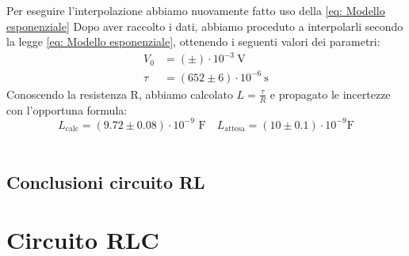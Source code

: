 \documentclass[letterpaper,12pt]{article}
\begin{document}
Per eseguire l'interpolazione abbiamo nuovamente fatto uso della \eqref{eq: Modello esponenziale}
Dopo aver raccolto i dati, abbiamo proceduto a interpolarli secondo la legge \eqref{eq: Modello esponenziale}, ottenendo i seguenti valori dei parametri:
\begin{align*}
    V_0 &= ( \pm )\cdot 10^{-3}\ \text{V} \\
    \tau &= (652 \pm 6) \cdot 10^{-6}\ \text{s}
\end{align*}
Conoscendo la resistenza R, abbiamo calcolato $L= \frac{\tau}{R}$ e propagato le incertezze con l'opportuna formula:
$$ L_\text{calc}= (9.72 \pm 0.08) \cdot 10^{-9} \text{ F} \quad
L_\text{attesa}= (10 \pm 0.1) \cdot 10^{-9} \text{F} %
$$ \\

\subsection{Conclusioni circuito RL}

\section{Circuito RLC}
\end{document}
